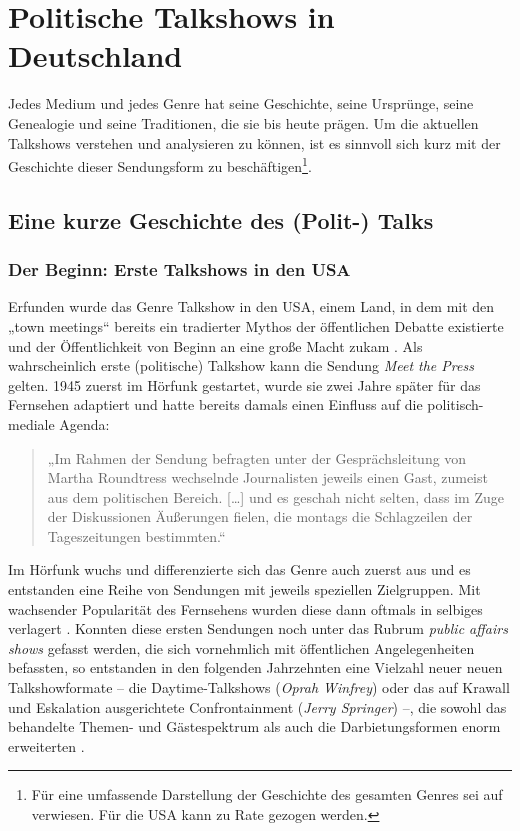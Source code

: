 \chapter{Politische Talkshows in Deutschland}
\label{chap:polittalks}

Jedes Medium und jedes Genre hat seine Geschichte, seine Ursprünge, seine Genealogie und seine Traditionen, die sie bis heute prägen. Um die aktuellen Talkshows verstehen und analysieren zu können, ist es sinnvoll sich kurz mit der Geschichte dieser Sendungsform zu beschäftigen\footnote{Für eine umfassende Darstellung der Geschichte des gesamten Genres sei auf \textcite{kellerGeschichteTalkshowDeutschland2009} verwiesen. Für die USA kann \textcite{timbergTelevisionTalkHistory2002} zu Rate gezogen werden.}.

\section{Eine kurze Geschichte des (Polit-) Talks}

\subsection{Der Beginn: Erste Talkshows in den USA}

Erfunden wurde das Genre Talkshow in den USA, einem Land, in dem mit den „town meetings“ bereits ein tradierter Mythos der öffentlichen Debatte existierte \parencite[24-28]{kellerGeschichteTalkshowDeutschland2009} und der Öffentlichkeit von Beginn an eine große Macht zukam \parencite[38ff.]{plakeTalkshowsIndustrialisierungKommunikation1999}. Als wahrscheinlich erste (politische) Talkshow kann die Sendung \textit{Meet the Press} gelten. 1945 zuerst im Hörfunk gestartet, wurde sie zwei Jahre später für das Fernsehen adaptiert und hatte bereits damals einen Einfluss auf die politisch-mediale Agenda:

\begin{quote}
	„Im Rahmen der Sendung befragten unter der Gesprächsleitung von Martha Roundtress wechselnde Journalisten jeweils einen Gast, zumeist aus dem politischen Bereich. [\ldots] und es geschah nicht selten, dass im Zuge der Diskussionen Äußerungen fielen, die montags die Schlagzeilen der Tageszeitungen bestimmten.“ \parencite[30]{kellerGeschichteTalkshowDeutschland2009}
\end{quote}

Im Hörfunk wuchs und differenzierte sich das Genre auch zuerst aus und es entstanden eine Reihe von Sendungen mit jeweils speziellen Zielgruppen. Mit wachsender Popularität des Fernsehens wurden diese dann oftmals in selbiges verlagert \parencite[30f.]{kellerGeschichteTalkshowDeutschland2009}. Konnten diese ersten Sendungen noch unter das Rubrum \textit{public affairs shows} gefasst werden, die sich vornehmlich mit öffentlichen Angelegenheiten befassten, so entstanden in den folgenden Jahrzehnten eine Vielzahl neuer  neuen Talkshowformate – die Daytime-Talkshows (\textit{Oprah Winfrey}) oder das auf Krawall und Eskalation ausgerichtete Confrontainment (\textit{Jerry Springer}) –, die sowohl das behandelte Themen- und Gästespektrum als auch die Darbietungsformen enorm erweiterten \parencite[48-59]{kellerGeschichteTalkshowDeutschland2009}.


